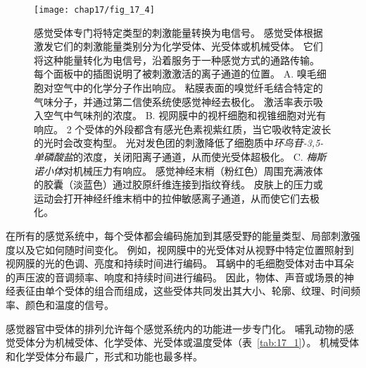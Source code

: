 \begin{figure}[htbp]
	\centering
	\texttt{[image: chap17/fig\_17\_4]}
	\caption{感觉受体专门将特定类型的刺激能量转换为电信号。 
		感觉受体根据激发它们的刺激能量类别分为化学受体、光受体或机械受体。
		它们将这种能量转化为电信号，沿着服务于一种感觉方式的通路传输。
		每个面板中的插图说明了被刺激激活的离子通道的位置。
		A. 嗅毛细胞对空气中的化学分子作出响应。
		粘膜表面的嗅觉纤毛结合特定的气味分子，并通过第二信使系统使感觉神经去极化。
		激活率表示吸入空气中气味剂的浓度。
		B. 视网膜中的视杆细胞和视锥细胞对光有响应。
		2 个受体的外段都含有感光色素视紫红质，当它吸收特定波长的光时会改变构型。
		光对发色团的刺激降低了细胞质中\textit{环鸟苷-3,5-单磷酸盐}的浓度，关闭阳离子通道，从而使光受体超极化\cite{schiller1995neurobiology}。
		C. \textit{梅斯诺小体}对机械压力有响应。 
		感觉神经末梢（粉红色）周围充满液体的胶囊（淡蓝色）通过胶原纤维连接到指纹脊线。
		皮肤上的压力或运动会打开神经纤维末梢中的拉伸敏感离子通道，从而使它们去极化\cite{albe1973morphology}。}
	\label{fig:17_4}
\end{figure}


在所有的感觉系统中，每个受体都会编码施加到其感受野的能量类型、局部刺激强度以及它如何随时间变化。
例如，视网膜中的光受体对从视野中特定位置照射到视网膜的光的色调、亮度和持续时间进行编码。
耳蜗中的毛细胞受体对击中耳朵的声压波的音调频率、响度和持续时间进行编码。
因此，物体、声音或场景的神经表征由单个受体的组合而组成，这些受体共同发出其大小、轮廓、纹理、时间频率、颜色和温度的信号。


感觉器官中受体的排列允许每个感觉系统内的功能进一步专门化。 
哺乳动物的感觉受体分为机械受体、化学受体、光受体或温度受体（表~\ref{tab:17_1}）。
机械受体和化学受体分布最广，形式和功能也最多样。


